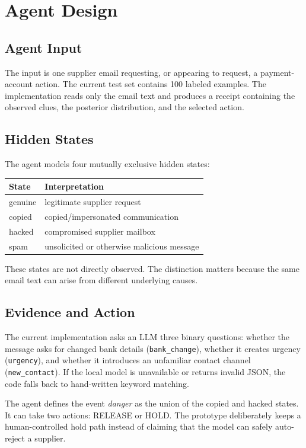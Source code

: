\documentclass{article}
\begin{document}
\section{Agent Design}

\subsection{Agent Input}
The input is one supplier email requesting, or appearing to request, a payment-account action. The current test set contains 100 labeled examples. The implementation reads only the email text and produces a receipt containing the observed clues, the posterior distribution, and the selected action.

\subsection{Hidden States}
The agent models four mutually exclusive hidden states:

\begin{center}
\begin{tabular}{@{}ll@{}}
\toprule
State & Interpretation \\
\midrule
genuine & legitimate supplier request \\
copied & copied/impersonated communication \\
hacked & compromised supplier mailbox \\
spam & unsolicited or otherwise malicious message \\
\bottomrule
\end{tabular}
\end{center}

These states are not directly observed. The distinction matters because the same email text can arise from different underlying causes.

\subsection{Evidence and Action}
The current implementation asks an LLM three binary questions: whether the message asks for changed bank details (\texttt{bank\_change}), whether it creates urgency (\texttt{urgency}), and whether it introduces an unfamiliar contact channel (\texttt{new\_contact}). If the local model is unavailable or returns invalid JSON, the code falls back to hand-written keyword matching.

The agent defines the event \emph{danger} as the union of the copied and hacked states. It can take two actions: RELEASE or HOLD. The prototype deliberately keeps a human-controlled hold path instead of claiming that the model can safely auto-reject a supplier.
\end{document}
